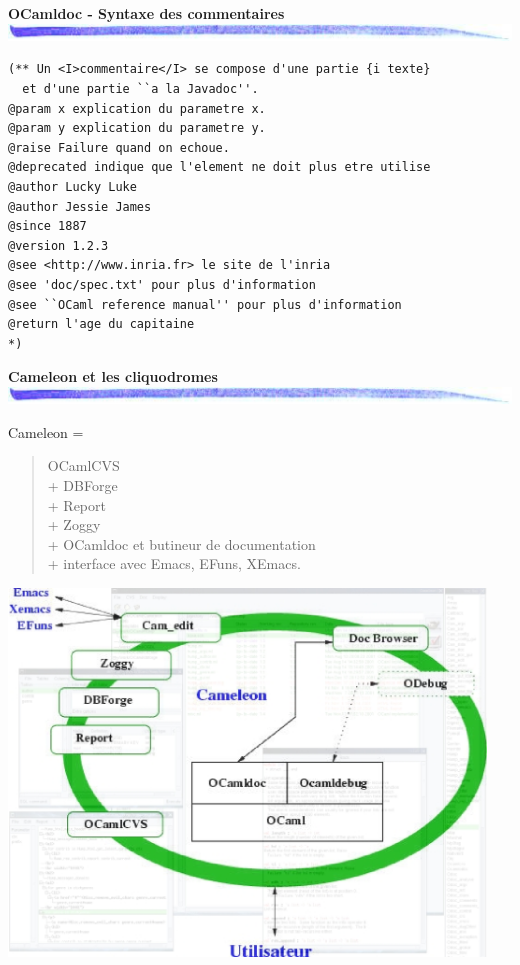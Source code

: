 \documentclass[landscape]{seminar}
\def\title#1#2{\noindent
{\bf\large #1}\\
\includegraphics[width=\textwidth]{bar.jpg.eps}
\vspace{#2cm}
}
\def\target#1{\hypertarget{#1}{}}
\begin{document}

\begin{slide}
\title{OCamldoc - Syntaxe des commentaires}{0}
\target{odoc2}
{\scriptsize {\begin{verbatim}
(** Un <I>commentaire</I> se compose d'une partie {i texte} 
  et d'une partie ``a la Javadoc''.
@param x explication du parametre x.
@param y explication du parametre y.
@raise Failure quand on echoue.
@deprecated indique que l'element ne doit plus etre utilise
@author Lucky Luke
@author Jessie James
@since 1887
@version 1.2.3
@see <http://www.inria.fr> le site de l'inria
@see 'doc/spec.txt' pour plus d'information
@see ``OCaml reference manual'' pour plus d'information
@return l'age du capitaine
*)
\end{verbatim}
}}
\end{slide}


\begin{slide}
\title{Cameleon et les cliquodromes}{0.5}
\target{cameleon}

Cameleon =
\begin{quote}
 OCamlCVS \\
 + DBForge\\
 + Report\\
 + Zoggy\\
 + OCamldoc et butineur de documentation\\
 + interface avec Emacs, EFuns, XEmacs.
\end{quote}
\end{slide}


\begin{slide}
\target{cam2}
\includegraphics[width=0.95\textwidth]{cameleon.eps}

\end{slide}
\end{document}
